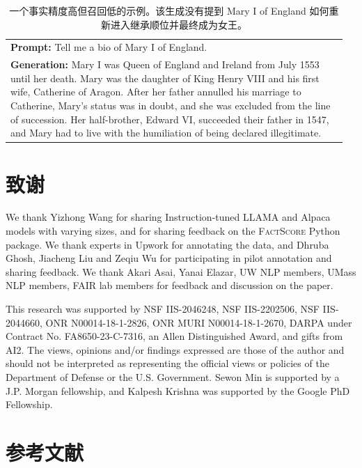 \documentclass[11pt,UTF8,fontset=fandol]{ctexart}
\newcommand{\FS}{\textsc{FactScore}}
\begin{document}
\begin{table}[H]\centering
\caption{一个事实精度高但召回低的示例。该生成没有提到 Mary I of England 如何重新进入继承顺位并最终成为女王。}
\label{tab:6}
\small
\begin{tabular}{p{0.96\linewidth}}
\toprule
\textbf{Prompt:} Tell me a bio of Mary I of England. \\
\textbf{Generation:} Mary I was Queen of England and Ireland from July 1553 until her death. Mary was the daughter of King Henry VIII and his first wife, Catherine of Aragon. After her father annulled his marriage to Catherine, Mary's status was in doubt, and she was excluded from the line of succession. Her half-brother, Edward VI, succeeded their father in 1547, and Mary had to live with the humiliation of being declared illegitimate. \\
\bottomrule
\end{tabular}
\end{table}

\section*{致谢}

We thank Yizhong Wang for sharing Instruction-tuned LLAMA and Alpaca models with varying sizes, and for sharing feedback on the \FS{} Python package. We thank experts in Upwork for annotating the data, and Dhruba Ghosh, Jiacheng Liu and Zeqiu Wu for participating in pilot annotation and sharing feedback. We thank Akari Asai, Yanai Elazar, UW NLP members, UMass NLP members, FAIR lab members for feedback and discussion on the paper.

This research was supported by NSF IIS-2046248, NSF IIS-2202506, NSF IIS-2044660, ONR N00014-18-1-2826, ONR MURI N00014-18-1-2670, DARPA under Contract No. FA8650-23-C-7316, an Allen Distinguished Award, and gifts from AI2. The views, opinions and/or findings expressed are those of the author and should not be interpreted as representing the official views or policies of the Department of Defense or the U.S. Government. Sewon Min is supported by a J.P. Morgan fellowship, and Kalpesh Krishna was supported by the Google PhD Fellowship.

\section*{参考文献}
\begingroup
\small
\setlength{\parindent}{0pt}
\setlength{\parskip}{0.45em}
\end{document}
